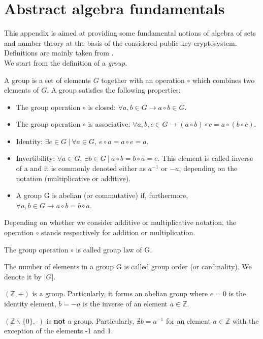 \chapter{Abstract algebra fundamentals}
\label{app:A}
This appendix is aimed at providing some fundamental notions of  algebra of sets and number theory at the basis of the considered public-key cryptosystem. Definitions are mainly taken from \cite{UnderstandingCrypto}.\\
We start from the definition of a \textit{group}.
\begin{mydef} A group is a set of elements $G$ together with an operation $\circ$ which combines two elements of $G$. A group  satisfies the following properties:
	\begin{itemize}
		\item The group operation $\circ$ is closed: $\forall a, b \in G \rightarrow a \circ b \in G$.
		\item The group operation $\circ$ is associative: $\forall a, b, c \in G  \rightarrow (a \circ b) \circ c = a \circ (b \circ c)$.
		\item Identity: $\exists e \in G \ | \ \forall a \in G, \ e \circ a = a \circ e = a$.
		\item Invertibility: $\forall a \in G, \ \exists b \in G \ | \ a \circ b = b \circ a = e$. This element is called inverse of a and it is commonly denoted either as $a^{-1}$ or $-a$, depending on the notation (multiplicative or additive).
		\item A group G is abelian (or commutative) if, furthermore, $\forall a, b \in G \rightarrow a \circ b = b \circ a$.
	\end{itemize}
\end{mydef}
\label{defA1}
\noindent
Depending on whether we consider additive or multiplicative notation, the operation $\circ$ stands respectively for addition or multiplication.
\begin{myrem} The group operation $\circ$ is called group law of G.
\end{myrem}
\begin{myrem} The number of elements in a group G is called group order (or cardinality). We denote it by $|G|$.
\end{myrem}
\begin{myexample}
$(\mathbb{Z},+)$ is a group. Particularly, it forms an abelian group where $e = 0$ is the identity element, $b = -a$ is the inverse of an element $a \in \mathbb{Z}$.
\end{myexample}
\begin{myexample}
$(\mathbb{Z} \backslash \{0\},\cdot)$ is \textbf{not} a group. Particularly, $\nexists b = a^{-1}$ for an element $a \in \mathbb{Z}$ with the exception of the elements -1 and 1.
\end{myexample}
